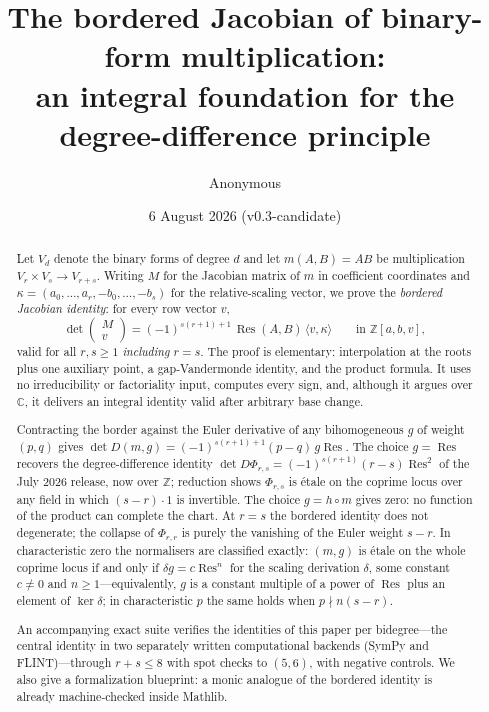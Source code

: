 \documentclass[11pt,reqno]{amsart}
\title[The bordered Jacobian of binary-form multiplication]
{The bordered Jacobian of binary-form multiplication:\\
an integral foundation for the degree-difference principle}
\author{Anonymous}
\date{6 August 2026 (v0.3-candidate)}
\theoremstyle{definition}
\theoremstyle{remark}
\newcommand{\C}{\mathbb C}
\newcommand{\Z}{\mathbb Z}
\newcommand{\Res}{\operatorname{Res}}
\begin{document}
\begin{abstract}
Let $V_d$ denote the binary forms of degree $d$ and let
$m(A,B)=AB$ be multiplication $V_r\times V_s\to V_{r+s}$.  Writing
$M$ for the Jacobian matrix of $m$ in coefficient coordinates and
$\kappa=(a_0,\dots,a_r,-b_0,\dots,-b_s)$ for the relative-scaling
vector, we prove the \emph{bordered Jacobian identity}: for every row
vector $v$,
\[
 \det\begin{pmatrix}M\\ v\end{pmatrix}
 =(-1)^{s(r+1)+1}\,\Res(A,B)\,\langle v,\kappa\rangle
 \qquad\text{in }\Z[a,b,v],
\]
valid for all $r,s\ge1$ \emph{including} $r=s$.  The proof is
elementary: interpolation at the roots plus one auxiliary
point, a gap-Vandermonde identity, and the product formula.  It uses
no irreducibility or factoriality input, computes every sign, and,
although it argues over $\C$, it delivers an integral identity valid
after arbitrary base change.

Contracting the border against the Euler derivative of any
bihomogeneous $g$ of weight $(p,q)$ gives
$\det D(m,g)=(-1)^{s(r+1)+1}(p-q)\,g\Res$.  The choice $g=\Res$
recovers the degree-difference identity
$\det D\Phi_{r,s}=(-1)^{s(r+1)}(r-s)\Res^2$ of the July 2026
release, now over $\Z$; reduction shows $\Phi_{r,s}$ is
\'etale on the coprime locus over any field in which
$(s-r)\cdot1$ is invertible.  The choice $g=h\circ m$ gives zero: no function of the
product can complete the chart.  At $r=s$ the bordered identity does
not degenerate; the collapse of $\Phi_{r,r}$ is purely the vanishing
of the Euler weight $s-r$.  In characteristic zero the normalisers
are classified exactly: $(m,g)$ is \'etale on the whole coprime
locus if and only if $\delta g=c\Res^n$ for the scaling derivation
$\delta$, some constant $c\ne0$ and $n\ge1$---equivalently, $g$ is
a constant multiple of a power of $\Res$ plus an element of
$\ker\delta$; in characteristic $p$ the same holds when
$p\nmid n(s-r)$.

An accompanying exact suite verifies the identities of this paper per
bidegree---the central identity in two separately written
computational backends (SymPy and FLINT)---through $r+s\le8$ with spot checks to
$(5,6)$, with negative controls.  We also give a formalization
blueprint: a monic analogue of the bordered identity is already
machine-checked inside Mathlib.
\end{abstract}

\maketitle
\end{document}
